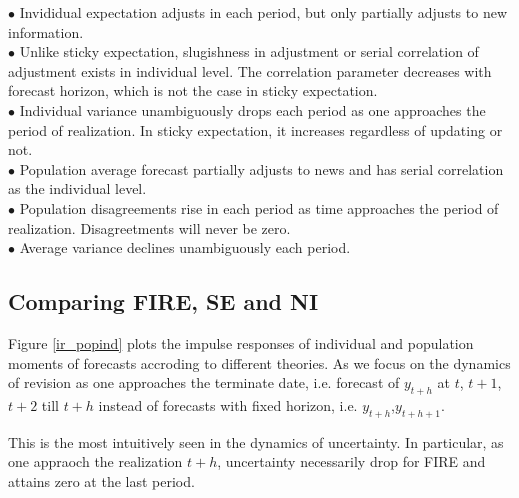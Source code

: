 \documentclass[]{article}
\begin{document}
$\bullet$  Invididual expectation adjusts in each period, but only partially adjusts to new information. \\
$\bullet$ Unlike sticky expectation, slugishness in adjustment or serial correlation of adjustment exists in individual level. The correlation parameter decreases with forecast horizon, which is not the case in sticky expectation.\\
$\bullet$  Individual variance unambiguously drops each period as one approaches the period of realization. In sticky expectation, it increases regardless of updating or not. \\ 
$\bullet$  Population average forecast partially adjusts to news and has serial correlation as the individual level. \\
$\bullet$  Population disagreements rise in each period as time approaches the period of realization. Disagreetments will never be zero. \\
$\bullet$  Average variance declines unambiguously each period. 

\subsection{Comparing FIRE, SE and NI}

Figure \ref{ir_popind} plots the impulse responses of individual and population moments of forecasts accroding to different theories. As we focus on the dynamics of revision as one approaches the terminate date, i.e. forecast of $y_{t+h}$ at $t$, $t+1$, $t+2$ till $t+h$ instead of forecasts with fixed horizon, i.e. $y_{t+h}$,$y_{t+h+1}$. 

This is the most intuitively seen in the dynamics of uncertainty. In particular, as one appraoch the realization $t+h$, uncertainty necessarily drop for FIRE and attains zero at the last period.  
\end{document}
